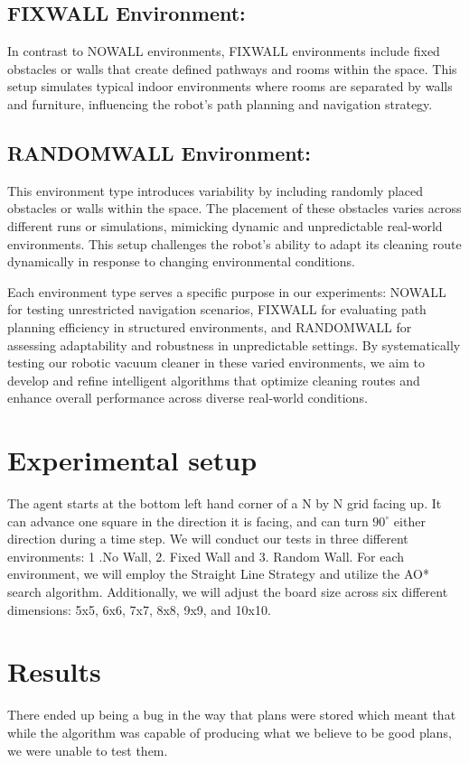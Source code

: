 \documentclass{article}
\begin{document}
\subsection{FIXWALL Environment:} In contrast to NOWALL environments, FIXWALL environments include fixed obstacles or walls that create defined pathways and rooms within the space. This setup simulates typical indoor environments where rooms are separated by walls and furniture, influencing the robot's path planning and navigation strategy.

\subsection{RANDOMWALL Environment:} This environment type introduces variability by including randomly placed obstacles or walls within the space. The placement of these obstacles varies across different runs or simulations, mimicking dynamic and unpredictable real-world environments. This setup challenges the robot's ability to adapt its cleaning route dynamically in response to changing environmental conditions.


Each environment type serves a specific purpose in our experiments: NOWALL for testing unrestricted navigation scenarios, FIXWALL for evaluating path planning efficiency in structured environments, and RANDOMWALL for assessing adaptability and robustness in unpredictable settings. By systematically testing our robotic vacuum cleaner in these varied environments, we aim to develop and refine intelligent algorithms that optimize cleaning routes and enhance overall performance across diverse real-world conditions.

\section{Experimental setup}
The agent starts at the bottom left hand corner of a N by N grid facing up. 
It can advance one square in the direction it is facing, and can turn $90^\circ$ either direction during a time step. 
We will conduct our tests in three different environments: 1 .No Wall, 2. Fixed Wall and 3. Random Wall.
For each environment, we will employ the Straight Line Strategy and utilize the AO* search algorithm. Additionally, we will adjust the board size across six different dimensions: 5x5, 6x6, 7x7, 8x8, 9x9, and 10x10.

 



\section{Results}
There ended up being a bug in the way that plans were stored which meant that while the algorithm was capable of producing what we believe to be good plans, we were unable to test them. 
\end{document}
